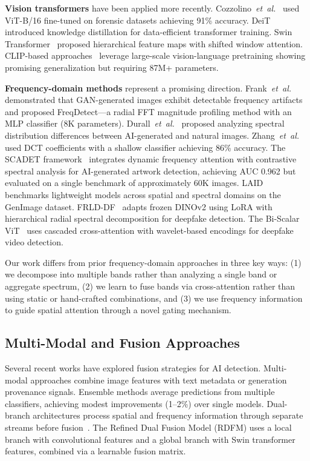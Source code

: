 \documentclass[journal]{IEEEtran}
\begin{document}
\textbf{Vision transformers} have been applied more recently. Cozzolino~\textit{et~al.}~\cite{cozzolino2023} used ViT-B/16 fine-tuned on forensic datasets achieving 91\% accuracy. DeiT~\cite{touvron2021} introduced knowledge distillation for data-efficient transformer training. Swin Transformer~\cite{liu2021} proposed hierarchical feature maps with shifted window attention. CLIP-based approaches~\cite{radford2021} leverage large-scale vision-language pretraining showing promising generalization but requiring 87M+ parameters.

\textbf{Frequency-domain methods} represent a promising direction. Frank~\textit{et~al.}~\cite{frank2020} demonstrated that GAN-generated images exhibit detectable frequency artifacts and proposed FreqDetect---a radial FFT magnitude profiling method with an MLP classifier (8K parameters). Durall~\textit{et~al.}~\cite{durall2021} proposed analyzing spectral distribution differences between AI-generated and natural images. Zhang~\textit{et~al.}~\cite{zhang2023} used DCT coefficients with a shallow classifier achieving 86\% accuracy. The SCADET framework~\cite{zhang2025} integrates dynamic frequency attention with contrastive spectral analysis for AI-generated artwork detection, achieving AUC 0.962 but evaluated on a single benchmark of approximately 60K images. LAID~\cite{chivaran2025} benchmarks lightweight models across spatial and spectral domains on the GenImage dataset. FRLD-DF~\cite{noureldin2026} adapts frozen DINOv2 using LoRA with hierarchical radial spectral decomposition for deepfake detection. The Bi-Scalar ViT~\cite{polamarasetti2026} uses cascaded cross-attention with wavelet-based encodings for deepfake video detection.

Our work differs from prior frequency-domain approaches in three key ways: (1) we decompose into multiple bands rather than analyzing a single band or aggregate spectrum, (2) we learn to fuse bands via cross-attention rather than using static or hand-crafted combinations, and (3) we use frequency information to guide spatial attention through a novel gating mechanism.

\subsection{Multi-Modal and Fusion Approaches}
Several recent works have explored fusion strategies for AI detection. Multi-modal approaches combine image features with text metadata or generation provenance signals. Ensemble methods average predictions from multiple classifiers, achieving modest improvements (1--2\%) over single models. Dual-branch architectures process spatial and frequency information through separate streams before fusion~\cite{tan2024, nie2026}. The Refined Dual Fusion Model (RDFM) uses a local branch with convolutional features and a global branch with Swin transformer features, combined via a learnable fusion matrix.
\end{document}
